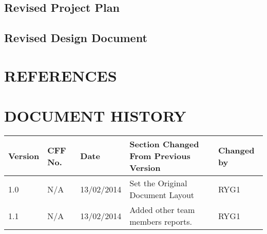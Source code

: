 \documentclass[12pt, portrait]{article}
\begin{document}
\subsection{Revised Project Plan}
\newpage
\subsection{Revised Design Document}
\newpage
\section{REFERENCES}
\newpage
\section{DOCUMENT HISTORY}
\setlength\LTleft{-0.5cm}
\begin{longtable}{|p{1.3cm}|p{1.5cm}|p{2cm}|p{7cm}| p{2cm}|}
\hline
	Version & CFF No. & Date & Section Changed From Previous Version & Changed by \\
\hline
	1.0&N/A&13/02/2014&Set the Original Document Layout&RYG1
 \\ 
\hline
	1.1&N/A&13/02/2014&Added other team members reports.&RYG1 \\
\hline
\end{longtable}
\end{document}
